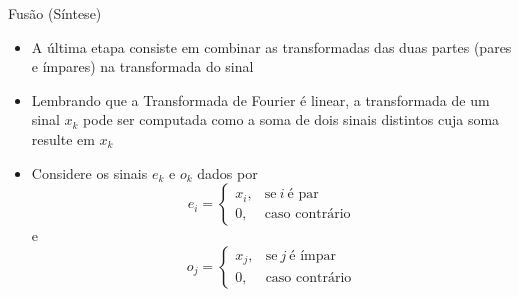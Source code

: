 \begin{frame}[fragile]{Fusão (Síntese)}

    \begin{itemize}
        \item A última etapa consiste em combinar as transformadas das duas partes (pares e
            ímpares) na transformada do sinal

        \item Lembrando que a Transformada de Fourier é linear, a transformada de um sinal $x_k$
            pode ser computada como a soma de dois sinais distintos cuja soma resulte em $x_k$

        \item Considere os sinais $e_k$ e $o_k$ dados por
        \[
            e_i = \left\{ \begin{array}{ll}
                    x_i, &\mbox{se}\ i\ \mbox{é par}\\
                    0, &\mbox{caso contrário}
                \end{array}\right.
        \]
        e
        \[
            o_j = \left\{ \begin{array}{ll}
                    x_j, &\mbox{se}\ j\ \mbox{é ímpar}\\
                    0, &\mbox{caso contrário}
                \end{array}\right.
        \]
 
    \end{itemize}

\end{frame}

